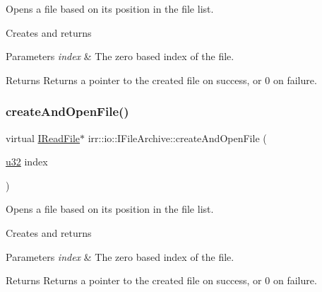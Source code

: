 Opens a file based on its position in the file list. 

Creates and returns 
\begin{DoxyParams}{Parameters}
{\em index} & The zero based index of the file. \\
\hline
\end{DoxyParams}
\begin{DoxyReturn}{Returns}
Returns a pointer to the created file on success, or 0 on failure. 
\end{DoxyReturn}
\mbox{\label{classirr_1_1io_1_1IFileArchive_ab6bc8fbd660bbbe42b4d30a9d4f26c7d}} 
\subsubsection{\texorpdfstring{create\+And\+Open\+File()}{createAndOpenFile()}\hspace{0.1cm}{\footnotesize\ttfamily [4/4]}}
{\footnotesize\ttfamily virtual \hyperlink{classirr_1_1io_1_1IReadFile}{I\+Read\+File}$\ast$ irr\+::io\+::\+I\+File\+Archive\+::create\+And\+Open\+File (\begin{DoxyParamCaption}\item[{\hyperlink{namespaceirr_a0416a53257075833e7002efd0a18e804}{u32}}]{index }\end{DoxyParamCaption})\hspace{0.3cm}{\ttfamily [pure virtual]}}



Opens a file based on its position in the file list. 

Creates and returns 
\begin{DoxyParams}{Parameters}
{\em index} & The zero based index of the file. \\
\hline
\end{DoxyParams}
\begin{DoxyReturn}{Returns}
Returns a pointer to the created file on success, or 0 on failure. 
\end{DoxyReturn}
\mbox{\label{classirr_1_1io_1_1IFileArchive_a73c683318837b13d16843373da00ded3}} 
